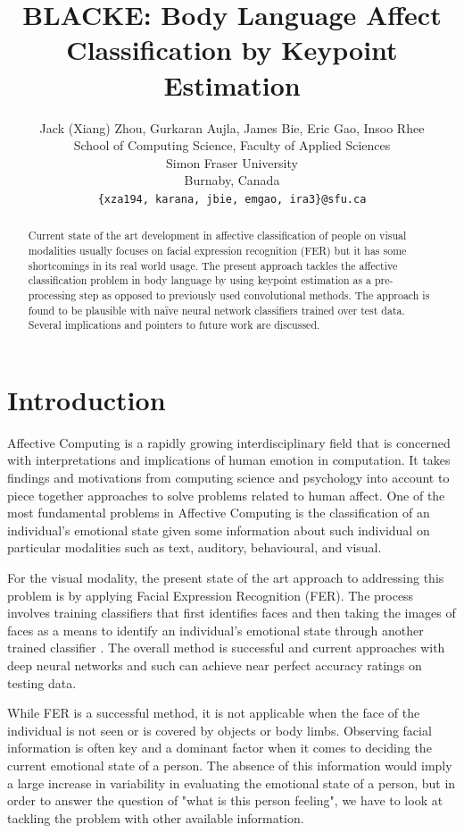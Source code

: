 \documentclass{article}
\title{BLACKE: Body Language Affect Classification by Keypoint Estimation}
\author{Jack (Xiang) Zhou, Gurkaran Aujla, James Bie, Eric Gao, Insoo Rhee\\
	School of Computing Science, 	
	Faculty of Applied Sciences\\
	Simon Fraser University\\
	Burnaby, Canada\\
	\texttt{\{xza194, karana, jbie, emgao, ira3\}@sfu.ca} \\
}
\begin{document}
\maketitle

\begin{abstract}
Current state of the art development in affective classification of people on visual modalities usually focuses on facial expression recognition (FER) but it has some shortcomings in its real world usage. The present approach tackles the affective classification problem in body language by using keypoint estimation as a pre-processing step as opposed to previously used convolutional methods. The approach is found to be plausible with na\"ive neural network classifiers trained over test data. Several implications and pointers to future work are discussed.
\end{abstract}

\section{Introduction}

Affective Computing is a rapidly growing interdisciplinary field that is concerned with interpretations and implications of human emotion in computation. It takes findings and motivations from computing science and psychology into account to piece together approaches to solve problems related to human affect. One of the most fundamental problems in Affective Computing is the classification of an individual's emotional state given some information about such individual on particular modalities such as text, auditory, behavioural, and visual.

For the visual modality, the present state of the art approach to addressing this problem is by applying Facial Expression Recognition (FER). The process involves training classifiers that first identifies faces and then taking the images of faces as a means to identify an individual's emotional state through another trained classifier \citep{li2018deep}. The overall method is successful and current approaches with deep neural networks and such can achieve near perfect accuracy ratings on testing data. 

While FER is a successful method, it is not applicable when the face of the individual is not seen or is covered by objects or body limbs. Observing facial information is often key and a dominant factor when it comes to deciding the current emotional state of a person. The absence of this information would imply a large increase in variability in evaluating the emotional state of a person, but in order to answer the question of "what is this person feeling", we have to look at tackling the problem with other available information.
\end{document}
